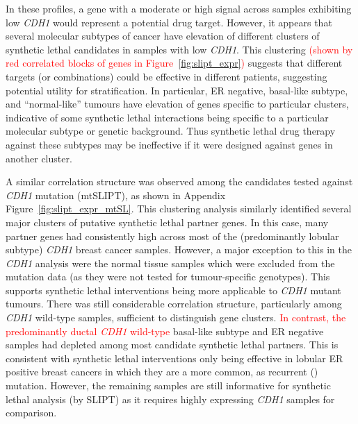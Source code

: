 In these  profiles, a gene with a moderate or high signal across samples exhibiting low \textit{CDH1}  would represent a potential drug target. However, it appears that several molecular subtypes of cancer have elevation of different clusters of \gls{synthetic lethal} candidates in samples with low \textit{CDH1}. This clustering \textcolor{red}{(shown by red correlated blocks of genes in Figure~\ref{fig:slipt_expr})} suggests that different targets (or combinations) could be effective in different patients, suggesting potential utility for stratification.  In particular, \gls{ER} negative, basal-like subtype, and ``normal-like'' tumours \citep{Eroles2012, Parker2009, Dai2015} have elevation of genes specific to particular clusters, indicative of some \gls{synthetic lethal} interactions being specific to a particular molecular subtype or genetic background. Thus \gls{synthetic lethal} drug therapy against these subtypes may be ineffective if it were designed against genes in another cluster.
 
A similar correlation structure was observed among the candidates tested against \textit{CDH1} \gls{mutation} (\acrshort{mtSLIPT}), as shown in Appendix Figure~\ref{fig:slipt_expr_mtSL}. This clustering analysis similarly identified several major clusters of putative \gls{synthetic lethal} partner genes. In this case, many partner genes had consistently high  across most of the (predominantly lobular subtype) \textit{CDH1} breast cancer samples. However, a major exception to this in the \textit{CDH1}  analysis were the normal tissue samples which were excluded from the \gls{mutation} data (as they were not tested for tumour-specific genotypes). This supports \gls{synthetic lethal} interventions being more applicable to \textit{CDH1} \gls{mutant} tumours. There was still considerable correlation structure, particularly among \textit{CDH1} \gls{wild-type} samples, sufficient to distinguish gene clusters. \textcolor{red}{In contrast, the predominantly ductal \textit{CDH1} \gls{wild-type}} basal-like subtype and \gls{ER} negative samples had depleted  among most candidate \gls{synthetic lethal} partners. This is consistent with \gls{synthetic lethal} interventions only being effective in lobular \gls{ER} positive breast cancers in which they are a more common, as recurrent () \gls{mutation}. However, the remaining samples are still informative for \gls{synthetic lethal} analysis (by \gls{SLIPT}) as it requires highly expressing \textit{CDH1} samples for comparison.

